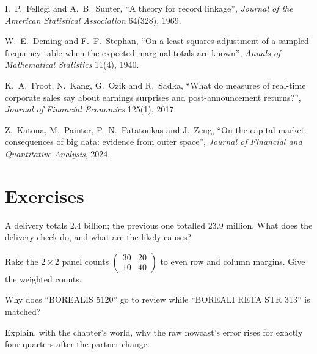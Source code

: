 \begin{omsources}
\item I.~P.~Fellegi and A.~B.~Sunter, ``A theory for record linkage'', \emph{Journal of the American Statistical Association}
64(328), 1969.
\item W.~E.~Deming and F.~F.~Stephan, ``On a least squares adjustment of a sampled frequency table when the expected marginal
totals are known'', \emph{Annals of Mathematical Statistics} 11(4), 1940.
\item K.~A.~Froot, N.~Kang, G.~Ozik and R.~Sadka, ``What do measures of real-time corporate sales say about earnings
surprises and post-announcement returns?'', \emph{Journal of Financial Economics} 125(1), 2017.
\item Z.~Katona, M.~Painter, P.~N.~Patatoukas and J.~Zeng, ``On the capital market consequences of big data: evidence from
outer space'', \emph{Journal of Financial and Quantitative Analysis}, 2024.
\end{omsources}

\section{Exercises}

\begin{exercise}[$\star$]\label{exo:ml:alternative-data-pipelines:1}
A delivery totals 2.4 billion; the previous one totalled 23.9 million. What does the delivery check do, and what are the
likely causes?
\end{exercise}

\begin{exercise}[$\star$]\label{exo:ml:alternative-data-pipelines:2}
Rake the $2\times2$ panel counts $\begin{pmatrix}30 & 20\\ 10 & 40\end{pmatrix}$ to even row and column margins. Give the
weighted counts.
\end{exercise}

\begin{exercise}[$\star$]\label{exo:ml:alternative-data-pipelines:3}
Why does ``BOREALIS 5120'' go to review while ``BOREALI RETA STR 313'' is matched?
\end{exercise}

\begin{exercise}[$\star\star$]\label{exo:ml:alternative-data-pipelines:4}
Explain, with the chapter's world, why the raw nowcast's error rises for exactly four quarters after the partner change.
\end{exercise}

